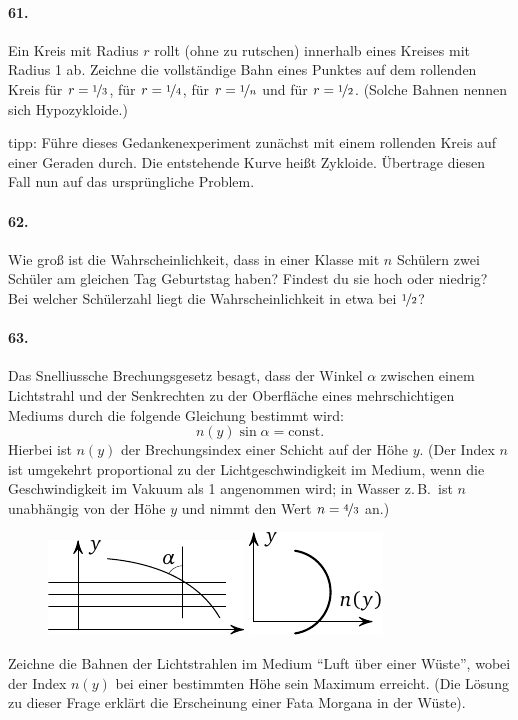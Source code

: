 \documentclass[10pt,a5paper,twoside]{article}
\newenvironment{problem}[1]{\paragraph*{#1}}{}
\begin{document}
\begin{problem}{61.}
	Ein Kreis mit Radius $r$ rollt (ohne zu rutschen) innerhalb eines Kreises mit Radius 1 ab.
	Zeichne die vollständige Bahn eines Punktes auf dem rollenden Kreis für $r=\nicefrac{1}{3}$, für $r=\nicefrac{1}{4}$, für $r=\nicefrac{1}{n}$ und für $r=\nicefrac{1}{2}$. (Solche Bahnen nennen sich Hypozykloide.)
	
	{\noindent\sc tipp:} Führe dieses Gedankenexperiment zunächst mit einem rollenden Kreis auf einer Geraden durch. Die entstehende Kurve heißt Zykloide. Übertrage diesen Fall nun auf das ursprüngliche Problem.
\end{problem}

\begin{problem}{62.}
	Wie groß ist die Wahrscheinlichkeit, dass in einer Klasse mit $n$ Schülern zwei Schüler am gleichen Tag Geburtstag haben? Findest du sie hoch oder niedrig? 
	Bei welcher Schülerzahl liegt die Wahrscheinlichkeit in etwa bei $\nicefrac{1}{2}$?
\end{problem}

\begin{problem}{63.}
	Das Snelliussche Brechungsgesetz besagt, dass der Winkel $\alpha$ zwischen einem Lichtstrahl und der Senkrechten zu der Oberfläche eines mehrschichtigen Mediums durch die folgende Gleichung bestimmt wird: 
	\begin{equation*}
		n(y) \sin \alpha=\text{const}.
	\end{equation*}
	Hierbei ist $n(y)$ der Brechungsindex einer Schicht auf der Höhe $y$. (Der Index $n$ ist umgekehrt proportional zu der Lichtgeschwindigkeit im Medium, wenn die Geschwindigkeit im Vakuum als 1 angenommen wird; in  Wasser z.\,B.\ ist $n$ unabhängig von der Höhe $y$ und nimmt den Wert $n=\nicefrac{4}{3}$ an.)
	\begin{figure}[H]
	\null\hfill
	\includegraphics{taskbook-47}
	\hfill
	\includegraphics{taskbook-471}
	\hfill\null
	\end{figure}

	Zeichne die Bahnen der Lichtstrahlen im Medium “Luft über einer Wüste”, wobei der Index $n(y)$ bei einer bestimmten Höhe sein Maximum erreicht. (Die Lösung zu dieser Frage erklärt die Erscheinung einer Fata Morgana in der Wüste).
\end{problem}
\end{document}
